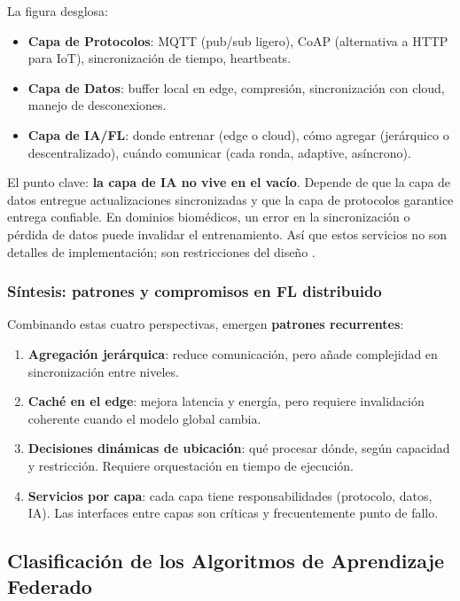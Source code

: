 \documentclass{report}
\begin{document}
La figura desglosa:

\begin{itemize}
    \item \textbf{Capa de Protocolos}: MQTT (pub/sub ligero), CoAP (alternativa a HTTP para IoT), sincronización de tiempo, heartbeats.
    
    \item \textbf{Capa de Datos}: buffer local en edge, compresión, sincronización con cloud, manejo de desconexiones.
    
    \item \textbf{Capa de IA/FL}: donde entrenar (edge o cloud), cómo agregar (jerárquico o descentralizado), cuándo comunicar (cada ronda, adaptive, asíncrono).
\end{itemize}

El punto clave: \textbf{la capa de IA no vive en el vacío}. Depende de que la capa de datos entregue actualizaciones sincronizadas y que la capa de protocolos garantice entrega confiable. En dominios biomédicos, un error en la sincronización o pérdida de datos puede invalidar el entrenamiento. Así que estos servicios no son detalles de implementación; son restricciones del diseño \cite{liu2024iiotframework}.

\subsubsection{Síntesis: patrones y compromisos en FL distribuido}

Combinando estas cuatro perspectivas, emergen \textbf{patrones recurrentes}:

\begin{enumerate}
    \item \textbf{Agregación jerárquica}: reduce comunicación, pero añade complejidad en sincronización entre niveles.
    \item \textbf{Caché en el edge}: mejora latencia y energía, pero requiere invalidación coherente cuando el modelo global cambia.
    \item \textbf{Decisiones dinámicas de ubicación}: qué procesar dónde, según capacidad y restricción. Requiere orquestación en tiempo de ejecución.
    \item \textbf{Servicios por capa}: cada capa tiene responsabilidades (protocolo, datos, IA). Las interfaces entre capas son críticas y frecuentemente punto de fallo.
\end{enumerate}

\subsection{Clasificación de los Algoritmos de Aprendizaje Federado}
\label{sec:fl-categories}
\end{document}
